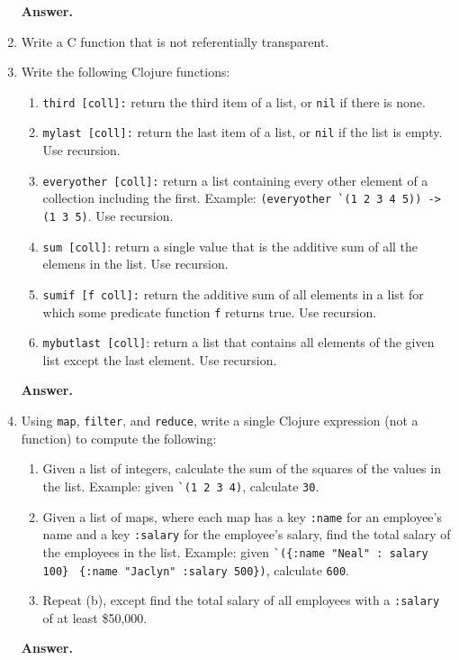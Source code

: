 \documentclass[9pt]{article}
\begin{document}
\begin{enumerate}
      \textbf{Answer.}
   \item Write a C function that is not referentially transparent.
   \item Write the following Clojure functions:

         \begin{enumerate}
            \item \verb|third [coll]:| return the third item of a list, or
                  \verb|nil| if there is none.
            \item \verb|mylast [coll]:| return the last item of a list, or
                  \verb|nil| if the list is empty. Use recursion.
            \item \verb|everyother [coll]:| return a list containing every other
                  element of a collection including the first. Example:
                  \verb|(everyother `(1 2 3 4 5)) -> (1 3 5)|. Use recursion.
            \item \verb|sum [coll]|: return a single value that is the additive
                  sum of all the elemens in the list. Use recursion.
            \item \verb|sumif [f coll]:| return the additive sum of all elements
                  in a list for which some predicate function \verb|f| returns
                  true. Use recursion.
            \item \verb|mybutlast [coll]|: return a list that contains all
                  elements of the given list except the last element. Use
                  recursion.
         \end{enumerate}

      \textbf{Answer.}
   \item Using \verb|map|, \verb|filter|, and \verb|reduce|, write a single
         Clojure expression (not a function) to compute the following:
         \begin{enumerate}
            \item Given a list of integers, calculate the sum of the squares of
                  the values in the list. Example: given \verb|`(1 2 3 4)|,
                  calculate \verb|30|.
            \item Given a list of maps, where each map has a key \verb|:name|
                  for an employee's name and a key \verb|:salary| for the
                  employee's salary, find the total salary of the employees in
                  the list. Example: given \verb|`({:name "Neal" : salary 100}|
                  \verb| {:name "Jaclyn" :salary 500})|, calculate \verb|600|.
            \item Repeat (b), except find the total salary of all employees with
                  a \verb|:salary| of at least \$50,000.
         \end{enumerate}

      \textbf{Answer.}
\end{enumerate}
\end{document}
